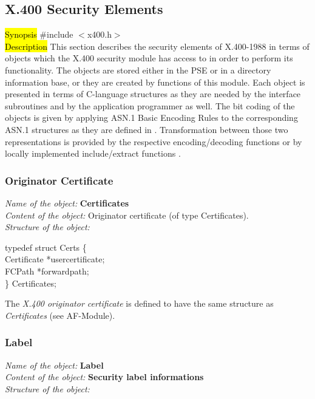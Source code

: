 \subsection{X.400 Security Elements}
\label{x4_se}
\hl{Synopsis}
\#include $<$x400.h$>$ \\ [1ex]
\hl{Description}     
This section describes the security elements of X.400-1988
in terms of objects
which the X.400 security module
has access to in order to perform its functionality.
The objects are stored either in the PSE or in
a directory information base,
or they are created by functions of this module.
Each object is presented in terms
of C-language structures as they are needed by the interface subroutines and
by the application programmer as well. The bit coding of the objects
is given by applying ASN.1 Basic Encoding Rules
to the corresponding ASN.1 structures as they are defined in
. Transformation between those two representations
is provided by the respective encoding/decoding functions
or by locally implemented include/extract functions
.

\subsubsection{Originator Certificate}
\label{x4_ocert}
{\em Name of the object:} {\bf Certificates} \\
{\em Content of the object:} Originator certificate (of type Certificates). \\
{\em Structure of the object:}

{\small
\btab
\1 typedef struct Certs \{ \\
\2    Certificate \2  *usercertificate; \\
\2    FCPath      \2  *forwardpath; \\
\1    \} Certificates; \\
\etab
}

The {\em X.400 originator certificate} is defined to have the
same structure as {\em Certificates}
(see AF-Module).

\subsubsection{Label}
\label{x4_Label}
{\em Name of the object:} {\bf Label} \\
{\em Content of the object:} {\bf Security label informations} \\
{\em Structure of the object:}

